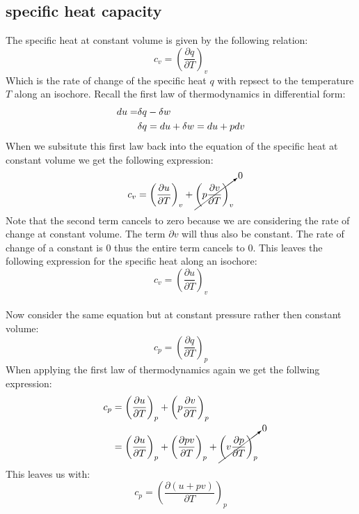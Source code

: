 \documentclass[11pt, a4paper]{article}
\begin{document}
\subsection{specific heat capacity}
The specific heat at constant volume is given by the following relation:
\begin{equation}
  c_v = \left( \frac{\partial q}{\partial T} \right)_v
\end{equation}
Which is the rate of change of the specific heat $q$ with repsect to the temperature $T$ along an isochore. Recall the first law of thermodynamics in differential form:
\begin{align}
  du = &\delta q - \delta w\\
       &\delta q = du + \delta w = du + pdv \notag
\end{align}
When we subsitute this first law back into the equation of the specific heat at constant volume we get the following expression:
\begin{equation*}
  c_v = \left( \frac{\partial u}{\partial T} \right)_v + \cancelto{0}{\left( p \frac{\partial v}{\partial T} \right)_v}
\end{equation*}
Note that the second term cancels to zero because we are considering the rate of change at constant volume. The term $\partial v$ will thus also be constant. The rate of change of a constant is $0$ thus the entire term cancels to $0$. This leaves the following expression for the specific heat along an isochore:
\begin{equation}
  c_v = \left( \frac{\partial u}{\partial T} \right)_v
\end{equation}
\\
Now consider the same equation but at constant pressure rather then constant volume:
\begin{equation}
  c_p = \left( \frac{\partial q}{\partial T} \right)_p
\end{equation}
When applying the first law of thermodynamics again we get the follwing expression:
\begin{align*}
  c_p &= \left( \frac{\partial u}{\partial T} \right)_p + \left( p \frac{\partial v}{\partial T} \right)_p \\
      &= \left( \frac{\partial u}{\partial T} \right)_p + \left( \frac{\partial pv}{\partial T} \right)_p + \cancelto{0}{\left( v \frac{\partial p}{\partial T} \right)_p}
\end{align*}
This leaves us with:
\begin{equation}
  c_p = \left( \frac{\partial(u + pv)}{\partial T} \right)_p
\end{equation}
\end{document}
